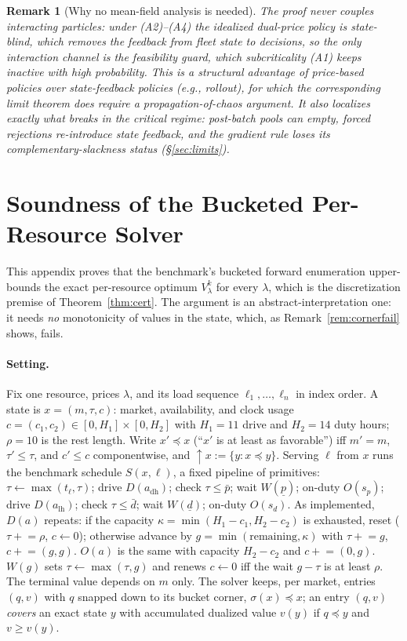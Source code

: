 \documentclass[11pt]{article}
\newtheorem{remark}{Remark}
\begin{document}
\begin{remark}[Why no mean-field analysis is needed]
\label{rem:whynochaos}
The proof never couples interacting particles: under (A2)--(A4) the
idealized dual-price policy is state-blind, which removes the feedback
from fleet state to decisions, so the only interaction channel is the
feasibility guard, which subcriticality (A1) keeps inactive with high
probability. This is a
structural advantage of price-based policies over state-feedback
policies (e.g., rollout), for which the corresponding limit theorem
does require a propagation-of-chaos argument. It also localizes
exactly what breaks in the critical regime: post-batch pools can
empty, forced rejections re-introduce state feedback, and the
gradient rule loses its complementary-slackness status
(\S\ref{sec:limits}).
\end{remark}

\section{Soundness of the Bucketed Per-Resource Solver}
\label{sec:bucketproof}

This appendix proves that the benchmark's bucketed forward enumeration
upper-bounds the exact per-resource optimum $V^k_{\lambda}$ for every
$\lambda$, which is the discretization premise of
Theorem~\ref{thm:cert}. The argument is an abstract-interpretation
one: it needs \emph{no} monotonicity of values in the state, which, as
Remark~\ref{rem:cornerfail} shows, fails.

\paragraph{Setting.} Fix one resource, prices $\lambda$, and its load
sequence $\ell_1, \dots, \ell_n$ in index order. A state is
$x = (m, \tau, c)$: market, availability, and clock usage
$c = (c_1, c_2) \in [0, H_1] \times [0, H_2]$ with $H_1 = 11$ drive and
$H_2 = 14$ duty hours; $\rho = 10$ is the rest length. Write
$x' \preceq x$ (``$x'$ is at least as favorable'') iff $m' = m$,
$\tau' \leq \tau$, and $c' \leq c$ componentwise, and
$\uparrow\! x := \{y : x \preceq y\}$. Serving $\ell$ from $x$ runs the
benchmark schedule $S(x, \ell)$, a fixed pipeline of primitives:
$\tau \leftarrow \max(t_\ell, \tau)$; drive $D(a_{\mathrm{dh}})$; check
$\tau \leq \bar{p}$; wait $W(\underline{p})$; on-duty $O(s_p)$; drive
$D(a_{\mathrm{lh}})$; check $\tau \leq \bar{d}$; wait $W(\underline{d})$;
on-duty $O(s_d)$. As implemented, $D(a)$ repeats: if the capacity
$\kappa = \min(H_1 - c_1, H_2 - c_2)$ is exhausted, reset
($\tau \mathrel{+}= \rho$, $c \leftarrow 0$); otherwise advance by
$g = \min(\text{remaining}, \kappa)$ with $\tau \mathrel{+}= g$,
$c \mathrel{+}= (g, g)$. $O(a)$ is the same with capacity $H_2 - c_2$
and $c \mathrel{+}= (0, g)$. $W(g)$ sets $\tau \leftarrow \max(\tau, g)$
and renews $c \leftarrow 0$ iff the wait $g - \tau$ is at least
$\rho$. The terminal value depends on $m$ only. The solver keeps, per
market, entries $(q, v)$ with $q$ snapped down to its bucket corner,
$\sigma(x) \preceq x$; an entry $(q, v)$ \emph{covers} an exact state
$y$ with accumulated dualized value $v(y)$ if $q \preceq y$ and
$v \geq v(y)$.
\end{document}
